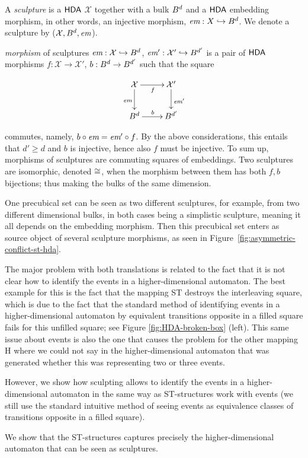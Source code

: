     \begin{definition}[Sculpture]
        \label{def:sculptures}
        A \emph{sculpture} is a $\text{\textup{\textsf{HDA}}}$ $\mathcal{X}$ together with a bulk $B^{d}$ and a $\text{\textup{\textsf{HDA}}}$ embedding morphism, in other words, an injective morphism, $\textit{em}: X\hookrightarrow B^{d}$. We denote a sculpture by ($\mathcal{X}, B^{d}, \textit{em}$).

        \emph{morphism} of sculptures $\textit{em}: \mathcal{X} \hookrightarrow B^{ d}$, $\textit{em}': \mathcal{X}' \hookrightarrow B^{ d'}$ is a pair of $\text{\textup{\textsf{HDA}}}$ morphisms $f: \mathcal{X} \to \mathcal{X}'$, $b: B^{ d}\to B^{ d'}$ such that the square

        \begin{equation*}
            \xymatrix{%
            \mathcal{X} \ar[d]_{\embedMorphism} \ar[r]_f & \mathcal{X}' \ar[d]^{\embedMorphism'}
            \\ \bulk{d} \ar[r]^b & \bulk{d'}
            }
        \end{equation*}

        commutes, namely, $b\circ \textit{em}= \textit{em}'\circ f$.  By the above considerations, this entails that $d'\ge d$ and $b$ is injective, hence also $f$ must be injective.  To sum up, morphisms of sculptures are commuting squares of embeddings. Two sculptures are isomorphic, denoted $\cong$, when the morphism between them has both $f,b$ bijections; thus making the bulks of the same dimension.
    \end{definition}

    \begin{remark}
        One precubical set can be seen as two different sculptures, for example, from two different dimensional bulks, in both cases being a simplistic sculpture, meaning it all depends on the embedding morphism. Then this precubical set enters as source object of several sculpture morphisms, as seen in Figure~\ref{fig:asymmetric-conflict-st-hda}.
    \end{remark}
    
    The major problem with both translations is related to the fact that it is not clear how to identify the events in a higher-dimensional automaton. The best example for this is the fact that the mapping ST destroys the interleaving square, which is due to the fact that the standard method of identifying events in a higher-dimensional automaton by equivalent transitions opposite in a filled square fails for this unfilled square; see Figure \ref{fig:HDA-broken-box} (left). This same issue about events is also the one that causes the problem for the other mapping H where we could not say in the higher-dimensional automaton that was generated whether this was representing two or three events.
    
    However, we show how sculpting allows to identify the events in a higher-dimensional automaton in the same way as ST-structures work with events (we still use the standard intuitive method of seeing events as equivalence classes of transitions opposite in a filled square).
    
    We show that the ST-structures captures precisely the higher-dimensional automaton that can be seen as sculptures. 

